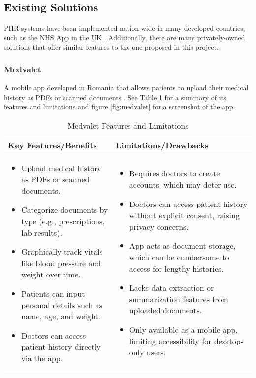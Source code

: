 \subsection{Existing Solutions}

PHR systems have been implemented nation-wide in many developed countries, such as the NHS App in the UK \parencite{phrlist}. Additionally, there are many privately-owned solutions that offer similar features to the one proposed in this project. 

\subsubsection{Medvalet}

A mobile app developed in Romania that allows patients to upload their medical history as PDFs or scanned documents \parencite{medvalet}. See Table \ref{tab:medvalet} for a summary of its features and limitations and figure \ref{fig:medvalet} for a screenshot of the app.

\begin{table}[h!]
\centering
    \begin{tabular}{|p{}|p{}|}
    \hline
    \textbf{Key Features/Benefits} & \textbf{Limitations/Drawbacks} \\ \hline
    \begin{itemize}
        \item Upload medical history as PDFs or scanned documents.
        \item Categorize documents by type (e.g., prescriptions, lab results).
        \item Graphically track vitals like blood pressure and weight over time.
        \item Patients can input personal details such as name, age, and weight.
        \item Doctors can access patient history directly via the app.
    \end{itemize} &
    \begin{itemize}
        \item Requires doctors to create accounts, which may deter use.
        \item Doctors can access patient history without explicit consent, raising privacy concerns.
        \item App acts as document storage, which can be cumbersome to access for lengthy histories.
        \item Lacks data extraction or summarization features from uploaded documents.
        \item Only available as a mobile app, limiting accessibility for desktop-only users.
    \end{itemize} \\ \hline
    \end{tabular}
\caption{Medvalet Features and Limitations}
\label{tab:medvalet}
\end{table}

